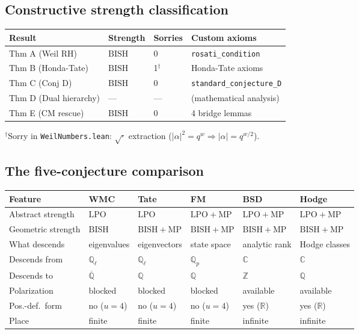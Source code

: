 \documentclass[11pt]{article}
\theoremstyle{definition}
\theoremstyle{remark}
\newcommand{\Z}{\mathbb{Z}}
\newcommand{\Q}{\mathbb{Q}}
\newcommand{\R}{\mathbb{R}}
\newcommand{\C}{\mathbb{C}}
\newcommand{\Qbar}{\overline{\Q}}
\newcommand{\Qell}{\Q_\ell}
\newcommand{\Qp}{\Q_p}
\newcommand{\LPO}{\mathrm{LPO}}
\newcommand{\MP}{\mathrm{MP}}
\newcommand{\BISH}{\mathrm{BISH}}
\begin{document}
\subsection{Constructive strength classification}

\begin{center}
\begin{tabular}{llll}
\toprule
\textbf{Result} & \textbf{Strength} & \textbf{Sorries} & \textbf{Custom axioms} \\
\midrule
Thm A (Weil RH) & $\BISH$ & 0 & \texttt{rosati\_condition} \\
Thm B (Honda-Tate) & $\BISH$ & 1$^\dag$ & Honda-Tate axioms \\
Thm C (Conj D) & $\BISH$ & 0 & \texttt{standard\_conjecture\_D} \\
Thm D (Dual hierarchy) & --- & --- & (mathematical analysis) \\
Thm E (CM rescue) & $\BISH$ & 0 & 4 bridge lemmas \\
\bottomrule
\end{tabular}
\end{center}
\smallskip\noindent
${}^\dag$Sorry in \texttt{WeilNumbers.lean}: $\sqrt{\cdot}$ extraction ($|\alpha|^2 = q^w \Rightarrow |\alpha| = q^{w/2}$).

\subsection{The five-conjecture comparison}

\begin{center}
\small
\begin{tabular}{llllll}
\toprule
\textbf{Feature} & \textbf{WMC} & \textbf{Tate} & \textbf{FM} & \textbf{BSD} & \textbf{Hodge} \\
\midrule
Abstract strength & $\LPO$ & $\LPO$ & $\LPO{+}\MP$ & $\LPO{+}\MP$ & $\LPO{+}\MP$ \\
Geometric strength & $\BISH$ & $\BISH{+}\MP$ & $\BISH{+}\MP$ & $\BISH{+}\MP$ & $\BISH{+}\MP$ \\
What descends & eigenvalues & eigenvectors & state space & analytic rank & Hodge classes \\
Descends from & $\Qell$ & $\Qell$ & $\Qp$ & $\C$ & $\C$ \\
Descends to & $\Qbar$ & $\Q$ & $\Q$ & $\Z$ & $\Q$ \\
Polarization & blocked & blocked & blocked & available & available \\
Pos.-def.\ form & no ($u=4$) & no ($u=4$) & no ($u=4$) & yes ($\R$) & yes ($\R$) \\
Place & finite & finite & finite & infinite & infinite \\
\bottomrule
\end{tabular}
\end{center}
\end{document}
